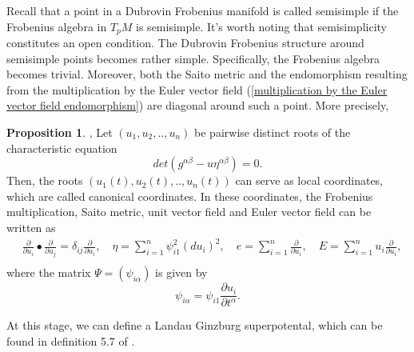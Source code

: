 \documentclass{article}
\theoremstyle{definition}
\newtheorem{proposition}[theorem]{Proposition}
\begin{document}
Recall that a point in a Dubrovin Frobenius manifold is called semisimple if the Frobenius algebra in $T_pM$ is semisimple. It's worth noting that semisimplicity constitutes an open condition. The Dubrovin Frobenius structure around semisimple points becomes rather simple. Specifically, the Frobenius algebra becomes trivial. Moreover, both the Saito metric and the endomorphism resulting from the multiplication by the Euler vector field (\ref{multiplication by the Euler vector field endomorphism}) are diagonal around such a point. More precisely,


\begin{proposition}\cite{B. Dubrovin2},\cite{B. Dubrovin3}
Let $(u_1,u_2,..,u_n)$ be pairwise distinct roots of the characteristic equation
\begin{equation}\label{spectral curve}
det(g^{\alpha\beta} -u\eta^{\alpha\beta} ) = 0.
\end{equation}
Then, the roots $(u_1(t),u_2(t),..,u_n(t))$ can serve as local coordinates, which are called canonical coordinates. In these coordinates, the Frobenius multiplication, Saito metric, unit vector field and Euler vector field can be written as 
\begin{equation}\label{Dubrovin Frobenius structure in canonical coordinates 1}
\begin{split}
&\frac{\partial}{\partial u_i}\bullet \frac{\partial}{\partial u_j}=\delta_{ij}\frac{\partial}{\partial u_i},\quad \eta=\sum_{i=1}^{n}\psi_{i1}^2 (du_i)^2, \quad e=\sum_{i=1}^n\frac{\partial}{\partial u_i},\quad E=\sum_{i=1}^n u_i\frac{\partial}{\partial u_i},\\
\end{split}
\end{equation}
where the matrix $\Psi=\left( \psi_{i\alpha}\right)$ is given by
\begin{equation*} 
\psi_{i\alpha}=\psi_{i1}\frac{\partial u_i}{\partial t^{\alpha}}.
\end{equation*}


\end{proposition}



At this stage, we can define a Landau Ginzburg superpotental, which can be found in definition 5.7 of  \cite{B. Dubrovin3}.
\end{document}
